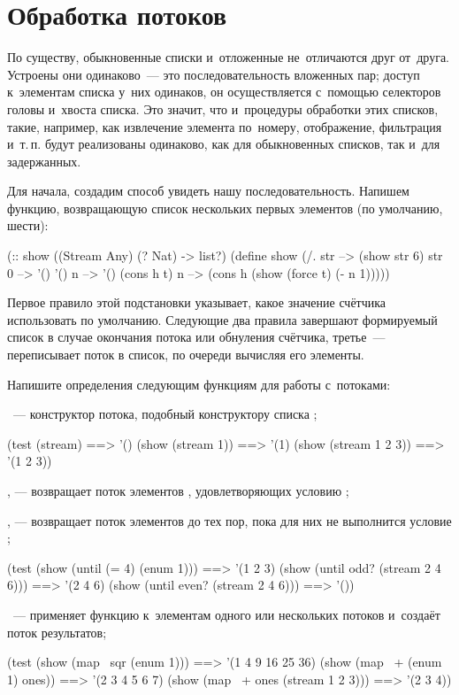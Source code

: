 \section[2]{Обработка потоков}%
По существу, обыкновенные списки и~отложенные не~отличаются друг от~друга. Устроены они одинаково~--- это последовательность вложенных пар; доступ к~элементам списка у~них одинаков, он осуществляется с~помощью селекторов головы и~хвоста списка. Это значит, что и~процедуры обработки этих списков, такие, например, как извлечение элемента по~номеру, отображение, фильтрация и~т.\,п. будут реализованы одинаково, как для обыкновенных списков, так и~для задержанных.

Для начала, создадим способ увидеть нашу последовательность. Напишем функцию, возвращающую список нескольких первых элементов (по умолчанию, шести):

\label{lazy-list}
\begin{Definition}[emph={str,n}]
(:: show ((Stream Any) (? Nat) -> list?)
 (define show
   (/. str   --> (show str 6)
       str 0 --> '()
       '() n --> '()
       (cons h t) n --> (cons h (show (force t) (- n 1)))))
\end{Definition}
Первое правило этой подстановки указывает, какое значение счётчика использовать по умолчанию. Следующие два правила завершают формируемый список в случае окончания потока или обнуления счётчика, третье~--- переписывает поток в список, по очереди вычисляя его элементы.

\begin{Assignment}
Напишите определения следующим функциям для работы с~потоками:

~--- конструктор потока, подобный конструктору списка ;
\begin{Specification}
(test 
  (stream)              ==> '()
  (show (stream 1))     ==> '(1)
  (show (stream 1 2 3)) ==> '(1 2 3))
\end{Specification}

\label{lazy-filter}, --- возвращает поток элементов , удовлетворяющих условию ;

, --- возвращает поток элементов  до тех пор, пока для них не выполнится условие ;

\begin{Specification}
(test
  (show (until (= 4) (enum 1)))       ==> '(1 2 3)
  (show (until odd? (stream 2 4 6)))  ==> '(2 4 6)
  (show (until even? (stream 2 4 6))) ==> '())
\end{Specification}

~--- применяет функцию  к~элементам одного или нескольких потоков и~создаёт поток результатов;

\begin{Specification}
(test
  (show (map~ sqr (enum 1)))          ==> '(1 4 9 16 25 36)
  (show (map~ + (enum 1) ones))       ==> '(2 3 4 5 6 7)
  (show (map~ + ones (stream 1 2 3))) ==> '(2 3 4))
\end{Specification}

\end{Assignment}


